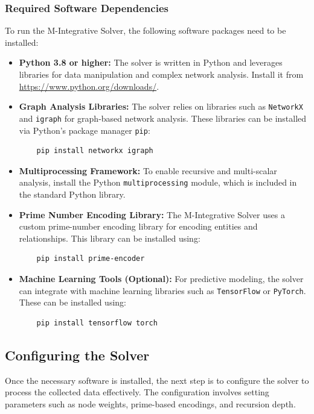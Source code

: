 \documentclass[%
 preprint, linenumbers,
 amsmath,amssymb,
 aps, physrev,
]{revtex4-2}
\begin{document}
\subsubsection{Required Software Dependencies}
To run the M-Integrative Solver, the following software packages need to be installed:

\begin{itemize}
    \item \textbf{Python 3.8 or higher:} The solver is written in Python and leverages libraries for data manipulation and complex network analysis. Install it from \href{https://www.python.org/downloads/}{https://www.python.org/downloads/}.
    \item \textbf{Graph Analysis Libraries:} The solver relies on libraries such as \texttt{NetworkX} and \texttt{igraph} for graph-based network analysis. These libraries can be installed via Python’s package manager \texttt{pip}:
    \begin{verbatim}
    pip install networkx igraph
    \end{verbatim}
    \item \textbf{Multiprocessing Framework:} To enable recursive and multi-scalar analysis, install the Python \texttt{multiprocessing} module, which is included in the standard Python library.
    \item \textbf{Prime Number Encoding Library:} The M-Integrative Solver uses a custom prime-number encoding library for encoding entities and relationships. This library can be installed using:
    \begin{verbatim}
    pip install prime-encoder
    \end{verbatim}
    \item \textbf{Machine Learning Tools (Optional):} For predictive modeling, the solver can integrate with machine learning libraries such as \texttt{TensorFlow} or \texttt{PyTorch}. These can be installed using:
    \begin{verbatim}
    pip install tensorflow torch
    \end{verbatim}
\end{itemize}

\subsection{Configuring the Solver}

Once the necessary software is installed, the next step is to configure the solver to process the collected data effectively. The configuration involves setting parameters such as node weights, prime-based encodings, and recursion depth.
\end{document}
